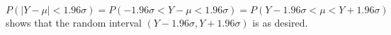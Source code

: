 

\setcounter{theorem}{27}
\begin{exercise}[BH.5.28]
\begin{solution}
    $$P(|Y-\mu|<1.96 \sigma)=P(-1.96 \sigma<Y-\mu<1.96 \sigma)=P(Y-1.96 \sigma<\mu<Y+1.96 \sigma)
    $$
    shows that the random interval $(Y-1.96 \sigma, Y+1.96 \sigma)$ is as desired.
\end{solution}
\end{exercise}


